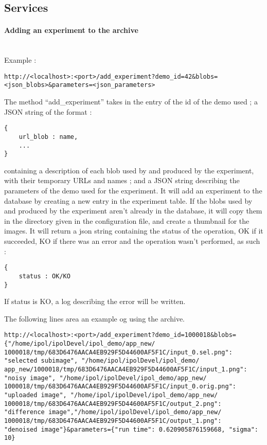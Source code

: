 
\subsection{Services}

\paragraph{Adding an experiment to the archive} \hspace{0pt} \\
Example :
\begin{verbatim}
http://<localhost>:<port>/add_experiment?demo_id=42&blobs=
<json_blobs>&parameters=<json_parameters>
\end{verbatim}
The method ``add\_experiment'' takes in the entry of the id of the demo used ; a JSON string of the format : 
\begin{verbatim}
{
    url_blob : name,
    ...
}
\end{verbatim}

containing a description of each blob used by and produced by the experiment, with their temporary URLs and names ; and a JSON string describing the parameters of the demo used for the experiment. It will add an experiment to the database by creating a new entry in the experiment table. If the blobs used by and produced by the experiment aren't already in the database, it will copy them in the directory given in the configuration file, and create a thumbnail for the images. It will return a json string containing the status of the operation, OK if it succeeded, KO if there was an error and the operation wasn't performed, as such :

\begin{verbatim}
{
    status : OK/KO
}
\end{verbatim}

If status is KO, a log describing the error will be written.

The following lines area an example og using the archive. 
\begin{verbatim}
http://<localhost>:<port>/add_experiment?demo_id=1000018&blobs=
{"/home/ipol/ipolDevel/ipol_demo/app_new/
1000018/tmp/683D6476AACA4EB929F5D44600AF5F1C/input_0.sel.png": 
"selected subimage", "/home/ipol/ipolDevel/ipol_demo/
app_new/1000018/tmp/683D6476AACA4EB929F5D44600AF5F1C/input_1.png":
"noisy image", "/home/ipol/ipolDevel/ipol_demo/app_new/
1000018/tmp/683D6476AACA4EB929F5D44600AF5F1C/input_0.orig.png": 
"uploaded image", "/home/ipol/ipolDevel/ipol_demo/app_new/
1000018/tmp/683D6476AACA4EB929F5D44600AF5F1C/output_2.png": 
"difference image","/home/ipol/ipolDevel/ipol_demo/app_new/
1000018/tmp/683D6476AACA4EB929F5D44600AF5F1C/output_1.png":
"denoised image"}&parameters={"run time": 0.620905876159668, "sigma": 10}
\end{verbatim}

